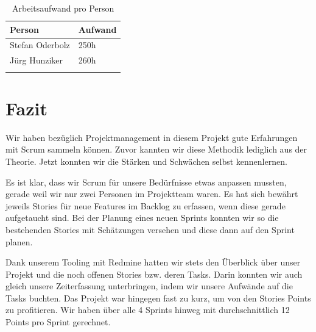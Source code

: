 \begin{longtable}{|l|l|}
\hline 
\textbf{Person} & \textbf{Aufwand} \\ 
\hline 
Stefan Oderbolz & 250h \\ 
\hline 
Jürg Hunziker & 260h \\ 
\hline 
\caption{Arbeitsaufwand pro Person}
\label{projektmanagement-arbeitsaufwand}
\end{longtable} 

\section{Fazit}
Wir haben bezüglich Projektmanagement in diesem Projekt gute Erfahrungen mit Scrum sammeln können. Zuvor kannten wir diese Methodik lediglich aus der Theorie. Jetzt konnten wir die Stärken und Schwächen selbst kennenlernen.

Es ist klar, dass wir Scrum für unsere Bedürfnisse etwas anpassen mussten, gerade weil wir nur zwei Personen im Projektteam waren. Es hat sich bewährt jeweils Stories für neue Features im Backlog zu erfassen, wenn diese gerade aufgetaucht sind. Bei der Planung eines neuen Sprints konnten wir so die bestehenden Stories mit Schätzungen versehen und diese dann auf den Sprint planen.

Dank unserem Tooling mit Redmine hatten wir stets den Überblick über unser Projekt und die noch offenen Stories bzw. deren Tasks. Darin konnten wir auch gleich unsere Zeiterfassung unterbringen, indem wir unsere Aufwände auf die Tasks buchten. Das Projekt war hingegen fast zu kurz, um von den Stories Points zu profitieren. Wir haben über alle 4 Sprints hinweg mit durchschnittlich 12 Points pro Sprint gerechnet.